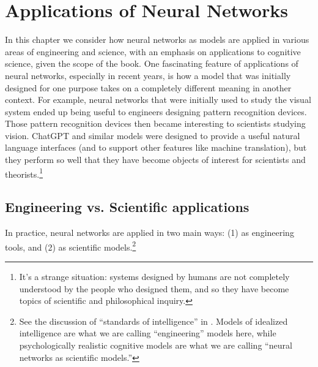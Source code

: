 \chapter{Applications of Neural Networks}\label{ch_applications}


In this chapter we consider how neural networks as models are applied in various areas of engineering and science, with an emphasis on applications to cognitive science, given the scope of the book. One fascinating feature of applications of neural networks, especially in recent years, is how a model that was initially designed for one purpose takes on a completely different meaning in another context. For example, neural networks that were initially used to study the visual system ended up being useful to engineers designing pattern recognition devices. Those pattern recognition devices then became interesting to scientists studying vision. ChatGPT and similar models were designed to provide a useful natural language  interfaces (and to support other features like machine translation), but they perform so well that they have become objects of interest for scientists and theorists.\footnote{It's a strange situation: systems designed by humans are not completely understood by the people who designed them, and so they have become topics of scientific and philosophical inquiry.}

\section{Engineering vs. Scientific applications}

In practice, neural networks are applied in two main ways: (1) as engineering tools, and (2) as scientific models.\footnote{See the discussion of ``standards of intelligence'' in \cite{noelle2022artificial}. Models of idealized intelligence are what we are calling ``engineering'' models here, while psychologically realistic cognitive models are what we are calling ``neural networks as scientific models.''}

